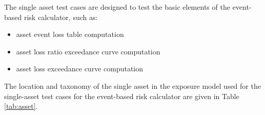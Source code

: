 The single asset test cases are designed to test the basic elements of the event-based risk calculator, such as:

\begin{itemize}
\item asset event loss table computation
\item asset loss ratio exceedance curve computation
\item asset loss exceedance curve computation
\end{itemize}



The location and taxonomy of the single asset in the exposure model used for the single-asset test cases for the event-based risk calculator are given in Table \ref{tab:asset}.
